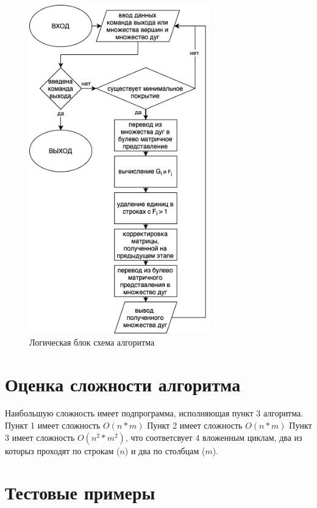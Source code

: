 \documentclass[12pt]{article}
\begin{document}
\begin{figure}[H]
    \centering
    \includegraphics[width=0.7\textwidth]{diagram.png}
    \caption{Логическая блок схема алгоритма}
    \label{fig:block_diagram}
\end{figure}

\section{Оценка сложности алгоритма}

Наибольшую сложность имеет подпрограмма, исполняющая
пункт 3 алгоритма. Пункт 1 имеет сложность $O(n * m)$
Пункт 2 имеет сложность $O(n * m)$
Пункт 3 имеет сложность $O(n^2 * m^2)$, что соответсвует $4$
вложенным циклам, два из которыз проходят по строкам ($n$) и
два по столбцам ($m$).

\section{Тестовые примеры}
\end{document}
